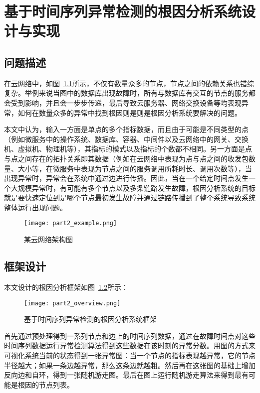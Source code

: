 
\chapter{基于时间序列异常检测的根因分析系统设计与实现}
\label{cha:root:cause:analysis}
\section{问题描述}
在云网络中，如图~\ref{fig:part2_example}所示，不仅有数量众多的节点，节点之间的依赖关系也错综复杂。举例来说当图中的数据库出现故障时，所有与数据库有交互的节点的服务都会受到影响，并且会一步步传递，最后导致云服务器、网络交换设备等均表现异常，如何在数量众多的异常中找到根因则是则是根因分析系统要解决的问题。

本文中认为，输入一方面是单点的多个指标数据，而且由于可能是不同类型的点（例如微服务中的操作系统、数据库、容器、中间件以及云网络中的网关、交换机、虚拟机、物理机等），其指标的模式以及指标的个数都不相同。另一方面是点与点之间存在的拓扑关系即其数据（例如在云网络中表现为点与点之间的收发包数量、大小等，在微服务中表现为节点之间的服务调用所耗时长、调用次数等），当出现异常时，异常会在系统中通过边进行传播。因此，当在一个给定时间点发生一个大规模异常时，有可能有多个节点以及多条链路发生故障，根因分析系统的目标就是要快速定位到是哪个节点最初发生故障并通过链路传播到了整个系统导致系统整体运行出现问题。

\begin{figure}[htbp]
  \centering
  \texttt{[image: part2\_example.png]}
  \caption{某云网络架构图}
  \label{fig:part2_example}
\end{figure}

\section{框架设计}
本文设计的根因分析框架如图~\ref{fig:part2-overview}所示：
\begin{figure}[htbp]
    \centering
    \texttt{[image: part2\_overview.png]}
    \caption{基于时间序列异常检测的根因分析系统框架}
    \label{fig:part2-overview}
  \end{figure}

首先通过预处理得到一系列节点和边上的时间序列数据，通过在故障时间点对这些时间序列数据运行异常检测算法得到这些数据在该时刻的异常分数。用图的方式来可视化系统当前的状态得到一张异常图：当一个节点的指标表现越异常，它的节点半径越大；如果一条边越异常，那么这条边就越粗。然后再在这张图的基础上增加反向边和自环，得到一张随机游走图。最后在图上运行随机游走算法来得到最有可能是根因的节点列表。

